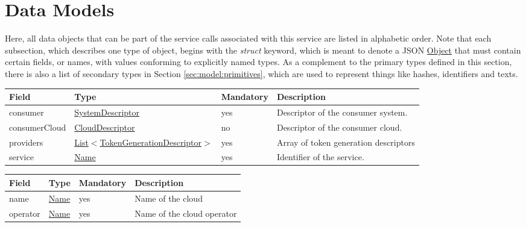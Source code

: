 \documentclass[a4paper]{arrowhead}
\newcommand{\pref}[1]{{\textcolor{ArrowheadGrey}{\hyperref[sec:model:primitives:#1]{#1}}}}
\begin{document}
\newpage

\section{Data Models}
\label{sec:model}

Here, all data objects that can be part of the service calls associated with this service are listed in alphabetic order.
Note that each subsection, which describes one type of object, begins with the \textit{struct} keyword, which is meant to denote a JSON \pref{Object} that must contain certain fields, or names, with values conforming to explicitly named types.
As a complement to the primary types defined in this section, there is also a list of secondary types in Section \ref{sec:model:primitives}, which are used to represent things like hashes, identifiers and texts.

\label{sec:model:TokenGenerationRequest}
 
\begin{table}[ht!]
\begin{tabularx}{\textwidth}{| p{3cm} | p{6cm} | p{2cm} | X |} \hline
\rowcolor{gray!33} Field & Type & Mandatory & Description \\ \hline
consumer & \hyperref[sec:model:SystemDescriptor]{SystemDescriptor} & yes & Descriptor of the consumer system. \\ \hline
consumerCloud & \hyperref[sec:model:CloudDescriptor]{CloudDescriptor} & no &  Descriptor of the consumer cloud. \\ \hline
providers &  \pref{List}$<$\hyperref[sec:model:TokenGenerationDescriptor]{TokenGenerationDescriptor}$>$ & yes & Array of token generation descriptors \\ \hline
service &\pref{Name} & yes & Identifier of the service. \\ \hline
\end{tabularx}
\end{table}

\label{sec:model:CloudDescriptor}

\begin{table}[ht!]
\begin{tabularx}{\textwidth}{| p{3cm} | p{3cm} | p{2cm} | X |} \hline
\rowcolor{gray!33} Field & Type & Mandatory & Description \\ \hline
name & \pref{Name} & yes & Name of the cloud \\ \hline
operator & \pref{Name} & yes & Name of the cloud operator \\ \hline
\end{tabularx}
\end{table}
\end{document}
